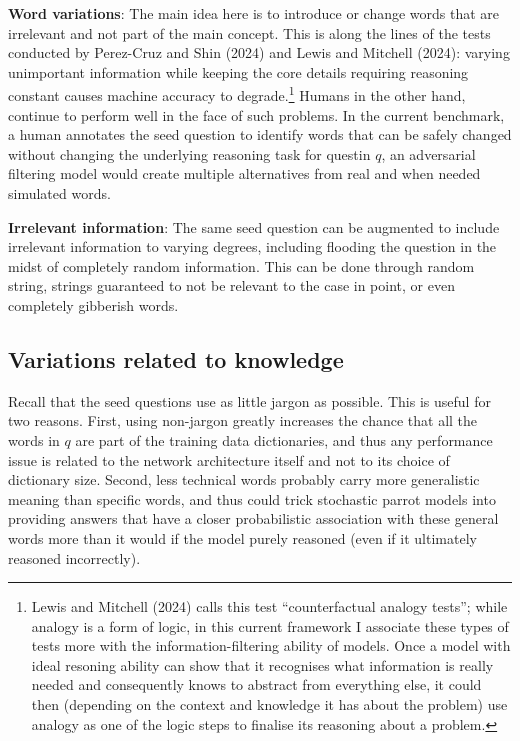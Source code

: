 \documentclass[
]{article}
\theoremstyle{plain}
\theoremstyle{definition}
\theoremstyle{remark}
\begin{document}
\textbf{Word variations}: The main idea here is to introduce or change
words that are irrelevant and not part of the main concept. This is
along the lines of the tests conducted by Perez-Cruz and Shin (2024) and
Lewis and Mitchell (2024): varying unimportant information while keeping
the core details requiring reasoning constant causes machine accuracy to
degrade.\footnote{Lewis and Mitchell (2024) calls this test
  ``counterfactual analogy tests''; while analogy is a form of logic, in
  this current framework I associate these types of tests more with the
  information-filtering ability of models. Once a model with ideal
  resoning ability can show that it recognises what information is
  really needed and consequently knows to abstract from everything else,
  it could then (depending on the context and knowledge it has about the
  problem) use analogy as one of the logic steps to finalise its
  reasoning about a problem.} Humans in the other hand, continue to
perform well in the face of such problems. In the current benchmark, a
human annotates the seed question to identify words that can be safely
changed without changing the underlying reasoning task for questin
\(q\), an adversarial filtering model would create multiple alternatives
from real and when needed simulated words.

\textbf{Irrelevant information}: The same seed question can be augmented
to include irrelevant information to varying degrees, including flooding
the question in the midst of completely random information. This can be
done through random string, strings guaranteed to not be relevant to the
case in point, or even completely gibberish words.

\subsection{Variations related to
knowledge}\label{variations-related-to-knowledge}

Recall that the seed questions use as little jargon as possible. This is
useful for two reasons. First, using non-jargon greatly increases the
chance that all the words in \(q\) are part of the training data
dictionaries, and thus any performance issue is related to the network
architecture itself and not to its choice of dictionary size. Second,
less technical words probably carry more generalistic meaning than
specific words, and thus could trick stochastic parrot models into
providing answers that have a closer probabilistic association with
these general words more than it would if the model purely reasoned
(even if it ultimately reasoned incorrectly).
\end{document}
